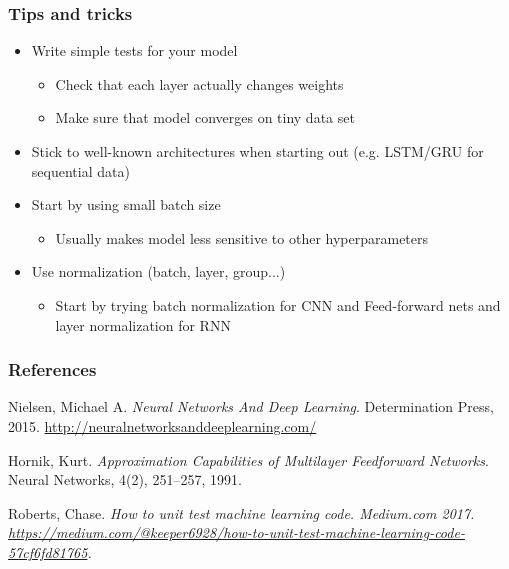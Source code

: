 \documentclass{beamer}
\begin{document}
  \begin{frame}
    \frametitle{Tips and tricks}  
    
   	\begin{itemize}
		\item Write simple tests for your model \cite{roberts}
		\begin{itemize}
      		\item{Check that each layer actually changes weights}
      		\item{Make sure that model converges on tiny data set}
    	\end{itemize}
		\item Stick to well-known architectures when starting out (e.g. LSTM/GRU for sequential data) 
		\item Start by using small batch size
		\begin{itemize}
      		\item{Usually makes model less sensitive to other hyperparameters}
      	\end{itemize}
		\item Use normalization (batch, layer, group...)
		\begin{itemize}
      		\item{Start by trying batch normalization for CNN and Feed-forward nets and layer normalization for RNN}
    	\end{itemize}		
	\end{itemize}
  \end{frame}  

%   
   \begin{frame}
   	\frametitle{References}
   	\begin{thebibliography}{Hornik, 1991}

   Nielsen, Michael A. {\em Neural Networks And Deep Learning}. Determination Press, 2015. \url{http://neuralnetworksanddeeplearning.com/}
  
   Hornik, Kurt. {\em Approximation Capabilities of Multilayer Feedforward Networks}. Neural Networks, 4(2), 251--257, 1991.
  
   Roberts, Chase. \em{How to unit test machine learning code.} Medium.com 2017. \url{https://medium.com/@keeper6928/how-to-unit-test-machine-learning-code-57cf6fd81765}.
    
	\end{thebibliography}   
   \end{frame}  
\end{document}
